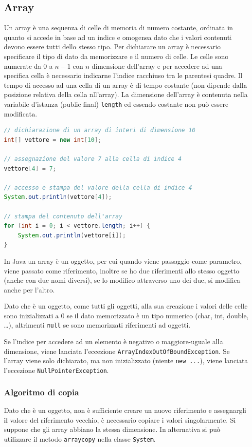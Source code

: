\documentclass{article}
\begin{document}
\subsection{Array}
Un array è una sequenza di celle di memoria di numero costante, ordinata in quanto si accede in base ad un indice e omogenea
dato che i valori contenuti devono essere tutti dello stesso tipo. Per dichiarare un array è necessario specificare il tipo
di dato da memorizzare e il numero di celle. Le celle sono numerate da \(0\) a \(n-1\) con \(n\) dimensione dell'array e per
accedere ad una specifica cella è necessario indicarne l'indice racchiuso tra le parentesi quadre. Il tempo di accesso ad una
cella di un array è di tempo costante (non dipende dalla posizione relativa della cella nll'array). La dimensione dell'array
è contenuta nella variabile d'istanza (public final) \verb|length| ed essendo costante non può essere modificata.

\begin{lstlisting}[language=Java]
// dichiarazione di un array di interi di dimensione 10
int[] vettore = new int[10];

// assegnazione del valore 7 alla cella di indice 4
vettore[4] = 7;

// accesso e stampa del valore della cella di indice 4
System.out.println(vettore[4]);

// stampa del contenuto dell'array
for (int i = 0; i < vettore.length; i++) {
	System.out.println(vettore[i]);
}
\end{lstlisting}

In Java un array è un oggetto, per cui quando viene passaggio come parametro, viene passato come riferimento, inoltre se ho due
riferimenti allo stesso oggetto (anche con due nomi diversi), se lo modifico attraverso uno dei due, si modifica anche per l'altro. 

Dato che è un oggetto, come tutti gli oggetti, alla sua creazione i valori delle celle sono inizializzati a 0 se il dato
memorizzato è un tipo numerico (char, int, double, \dots), altrimenti \verb|null| se sono memorizzati riferimenti ad oggetti.

Se l'indice per accedere ad un elemento è negativo o maggiore-uguale alla dimensione, viene lanciata l'eccezione
\verb|ArrayIndexOutOfBoundException|. Se l'array viene solo dichiarato, ma non inizializzato (niente \verb|new ...|), viene
lanciata l'eccezione \verb|NullPointerException|.

\subsubsection*{Algoritmo di copia}
Dato che è un oggetto, non è sufficiente creare un nuovo riferimento e assegnargli il valore del riferimento vecchio, è necessario
copiare i valori singolarmente. Si suppone che gli array abbiano la stessa dimensione. In alternativa si può utilizzare il metodo
\verb|arraycopy| nella classe \verb|System|.
\end{document}
